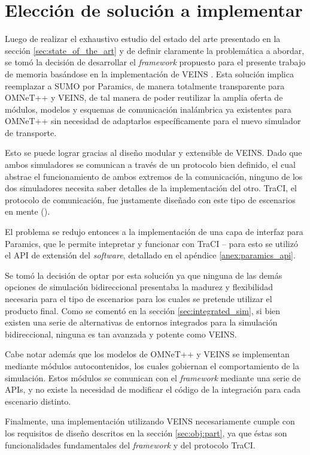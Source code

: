 \section{Elección de solución a implementar}\label{sec:solution}

Luego de realizar el exhaustivo estudio del estado del arte presentado en la sección \ref{sec:state_of_the_art} y de definir claramente la problemática a abordar, se tomó la decisión de desarrollar el \emph{framework} propuesto para el presente trabajo de memoria basándose en la implementación de VEINS \autocite{sommer_german_dressler, sommer_dressler2}. Esta solución implica reemplazar a SUMO por Paramics, de manera totalmente transparente para OMNeT++ y VEINS, de tal manera de poder reutilizar la amplia oferta de módulos, modelos y esquemas de comunicación inalámbrica ya existentes para OMNeT++ sin necesidad de adaptarlos específicamente para el nuevo simulador de transporte. 

Esto se puede lograr gracias al diseño modular y extensible de VEINS. Dado que ambos simuladores se comunican a través de un protocolo bien definido, el cual abstrae el funcionamiento de ambos extremos de la comunicación, ninguno de los dos simuladores necesita saber detalles de la implementación del otro. TraCI, el protocolo de comunicación, fue justamente diseñado con este tipo de escenarios en mente (\autocite{traci}).

El problema se redujo entonces a la implementación de una capa de interfaz para Paramics, que le permite intepretar y funcionar con TraCI -- para esto se utilizó el API de extensión del \emph{software}, detallado en el apéndice \ref{anex:paramics_api}. 

Se tomó la decisión de optar por esta solución ya que ninguna de las demás opciones de simulación bidireccional presentaba la madurez y flexibilidad necesaria para el tipo de escenarios para los cuales se pretende utilizar el producto final. Como se comentó en la sección \ref{sec:integrated_sim}, si bien existen una serie de alternativas de entornos integrados para la simulación bidireccional, ninguna es tan avanzada y potente como VEINS.

Cabe notar además que los modelos de OMNeT++ y VEINS se implementan mediante módulos autocontenidos, los cuales gobiernan el comportamiento de la simulación. Estos módulos se comunican con el \emph{framework} mediante una serie de APIs, y no existe la necesidad de modificar el código de la integración para cada escenario distinto.

Finalmente, una implementación utilizando VEINS necesariamente cumple con los requisitos de diseño descritos en la sección \ref{sec:obj:part}, ya que éstas son funcionalidades fundamentales del \emph{framework} y del protocolo TraCI.